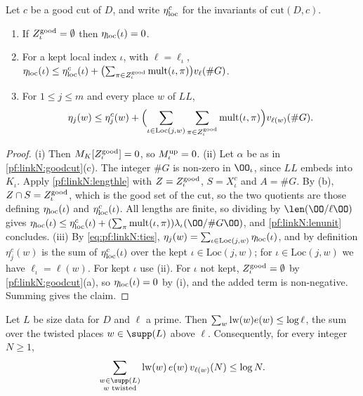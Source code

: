 \begin{lemma}\label{pf:linkN:etale}
Let $c$ be a good cut of $D$, and write $\eta_{\mathrm{loc}}^c$ for the invariants of $\mathrm{cut}(D,c)$.
\begin{enumerate}[label=(\roman*)]
\item If $Z^{\mathrm{good}}_\iota=\emptyset$ then $\eta_{\mathrm{loc}}(\iota)=0$.
\item For a kept local index $\iota$, with $\ell=\ell_\iota$,
$\eta_{\mathrm{loc}}(\iota)\le\eta_{\mathrm{loc}}^c(\iota)+\bigl(\sum_{\pi\in Z^{\mathrm{good}}_\iota}\mathrm{mult}(\iota,\pi)\bigr)v_\ell(\#G)$.
\item For $1\le j\le m$ and every place $w$ of $\mathit{LL}$,
\[
\eta_j(w)\le\eta^c_j(w)+\Bigl(\sum_{\iota\in\mathrm{Loc}(j,w)}\sum_{\pi\in Z^{\mathrm{good}}_\iota}\mathrm{mult}(\iota,\pi)\Bigr)
v_{\ell(w)}(\#G).
\]
\end{enumerate}
\end{lemma}

\begin{proof}
(i) Then $M_K[Z^{\mathrm{good}}_\iota]=0$, so $M^{\mathrm{up}}_\iota=0$.
(ii) Let $\alpha$ be as in \cref{pf:linkN:goodcut}(c). The integer $\#G$ is non-zero in $\OO_\iota$, since $\mathit{LL}$ embeds
into $K_\iota$. Apply \cref{pf:linkN:lengthle} with $Z=Z^{\mathrm{good}}_\iota$, $S=X^c_\iota$ and $A=\#G$. By (b),
$Z\cap S=Z^{\mathrm{good}}_\iota$, which is the good set of the cut, so the two quotients are those defining $\eta_{\mathrm{loc}}(\iota)$ and
$\eta_{\mathrm{loc}}^c(\iota)$. All lengths are finite, so dividing by $\len(\OO/\ell\OO)$ gives
$\linkNloc(\iota)\le\linkNloc^c(\iota)+(\sum_\pi\linkNmult(\iota,\pi))\lambda_\iota(\OO/\#G\OO)$, and \cref{pf:linkN:lenunit}
concludes.
(iii) By \eqref{eq:pf:linkN:ties}, $\eta_j(w)=\sum_{\iota\in\mathrm{Loc}(j,w)}\eta_{\mathrm{loc}}(\iota)$, and by definition $\eta^c_j(w)$ is the
sum of $\eta_{\mathrm{loc}}^c(\iota)$ over the kept $\iota\in\mathrm{Loc}(j,w)$; for $\iota\in\mathrm{Loc}(j,w)$ we have $\ell_\iota=\ell(w)$.
For kept $\iota$ use (ii). For $\iota$ not kept, $Z^{\mathrm{good}}_\iota=\emptyset$ by \cref{pf:linkN:goodcut}(a), so
$\eta_{\mathrm{loc}}(\iota)=0$ by (i), and the added term is non-negative. Summing gives the claim.
\end{proof}

\begin{lemma}\label{pf:linkN:meanw}
Let $L$ be size data for $D$ and $\ell$ a prime. Then $\sum_w\mathrm{lw}(w)e(w)\le\log\ell$, the sum over the twisted places
$w\in\supp(L)$ above $\ell$. Consequently, for every integer $N\ge1$,
\[
\sum_{\substack{w\in\supp(L)\\ w\text{ twisted}}}\linkNlw(w)\,e(w)\,v_{\ell(w)}(N)\le\log N.
\]
\end{lemma}

